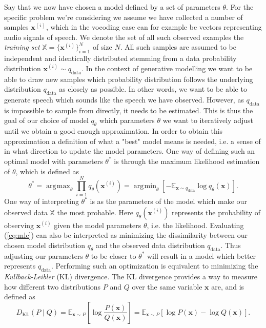 \documentclass{report}
\DeclareMathOperator*{\argmax}{\arg\!\max}
\DeclareMathOperator*{\argmin}{\arg\!\min}
\begin{document}
Say that we now have chosen a model defined by a set of parameters $\theta$. For the specific problem we're considering we assume we have collected a number of samples $\bm{x}^{(i)}$, which in the vocoding case can for example be vectors representing audio signals of speech. We denote the set of all such observed examples the \textit{training set} $\mathbb{X} = \{\bm{x}^{(i)}\}_{i=1}^{N}$ of size $N$. All such samples are assumed to be independent and identically distributed stemming from a data probability distribution $\bm{x}^{(i)} \sim q_{\text{data}}$. In the context of generative modelling we want to be able to draw new samples which probability distribution follows the underlying distribution $q_{\text{data}}$ as closely as possible. In other words, we want to be able to generate speech which sounds like the speech we have observed. However, as $q_{\text{data}}$ is impossible to sample from directly, it needs to be estimated. This is thus the goal of our choice of model $q_{\theta}$ which parameters $\theta$ we want to iteratively adjust until we obtain a good enough approximation. In order to obtain this approximation a definition of what a "best" model means is needed, i.e. a sense of in what direction to update the model parameters. One way of defining such an optimal model with parameters $\theta^{*}$ is through the maximum likelihood estimation of $\theta$, which is defined as
\begin{equation} \label{eq:mle}
    \theta^{*} = \argmax_{\theta} \prod_{i=1}^N q_{\theta}\left(\bm{x}^{(i)}\right) = \argmin_{\theta} \left[ -\mathbb{E}_{\bm{x} \sim q_{\text{data}}} \log q_{\theta}(\bm{x}) \right].
\end{equation}
One way of interpreting $\theta^*$ is as the parameters of the model which make our observed data $\mathbb{X}$ the most probable. Here $q_{\theta}(\bm{x}^{(i)})$ represents the probability of observing $\bm{x}^{(i)}$ given the model parameters $\theta$, i.e. the likelihood. Evaluating (\ref{eq:mle}) can also be interpreted as minimizing the dissimilarity between our chosen model distribution $q_{\theta}$ and the observed data distribution $q_{\text{data}}$. Thus adjusting our parameters $\theta$ to be closer to $\theta^{*}$ will result in a model which better represents $q_{\text{data}}$. Performing such an optimization is equivalent to minimizing the \textit{Kullback-Leibler} (KL) divergence. The KL divergence provides a way to measure how different two distributions $P$ and $Q$ over the same variable $\bm{x}$ are, and is defined as
\begin{equation}
    D_{\text{KL}}(P \mid Q) = \mathbb{E}_{\bm{x}\sim P}\left[ \log \frac{P(\bm{x})}{Q{(\bm{x})}} \right] = \mathbb{E}_{\bm{x}\sim P}\left[ \log P(\bm{x}) - \log Q(\bm{x}) \right].
\end{equation}
\end{document}
